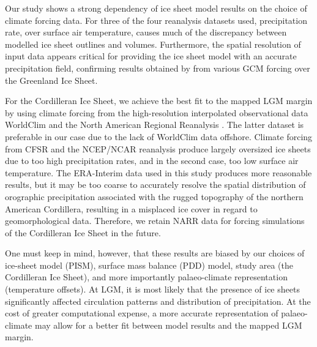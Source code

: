 \conclusions
\label{sec:concl}

Our study shows a strong dependency of ice sheet model results on the choice of climate forcing data. For three of the four reanalysis datasets used, precipitation rate, over surface air temperature, causes much of the discrepancy between modelled ice sheet outlines and volumes. Furthermore, the spatial resolution of input data appears critical for providing the ice sheet model with an accurate precipitation field, confirming results obtained by \citet{quiquet-etal-2012} from various GCM forcing over the Greenland Ice Sheet.

For the Cordilleran Ice Sheet, we achieve the best fit to the mapped LGM margin by \citet{dyke-2004} using climate forcing from the high-resolution interpolated observational data WorldClim \citep{data:worldclim} and the North American Regional Reanalysis \citep[NARR;][]{data:narr}. The latter dataset is preferable in our case due to the lack of WorldClim data offshore. Climate forcing from CFSR and the NCEP/NCAR reanalysis produce largely oversized ice sheets due to too high precipitation rates, and in the second case, too low surface air temperature. The ERA-Interim data used in this study produces more reasonable results, but it may be too coarse to accurately resolve the spatial distribution of orographic precipitation associated with the rugged topography of the northern American Cordillera, resulting in a misplaced ice cover in regard to geomorphological data. Therefore, we retain NARR data for forcing simulations of the Cordilleran Ice Sheet in the future.

One must keep in mind, however, that these results are biased by our choices of ice-sheet model (PISM), surface mass balance (PDD) model, study area (the Cordilleran Ice Sheet), and more importantly palaeo-climate representation (temperature offsets). At LGM, it is most likely that the presence of ice sheets significantly affected circulation patterns and distribution of precipitation. At the cost of greater computational expense, a more accurate representation of palaeo-climate may allow for a better fit between model results and the mapped LGM margin.
